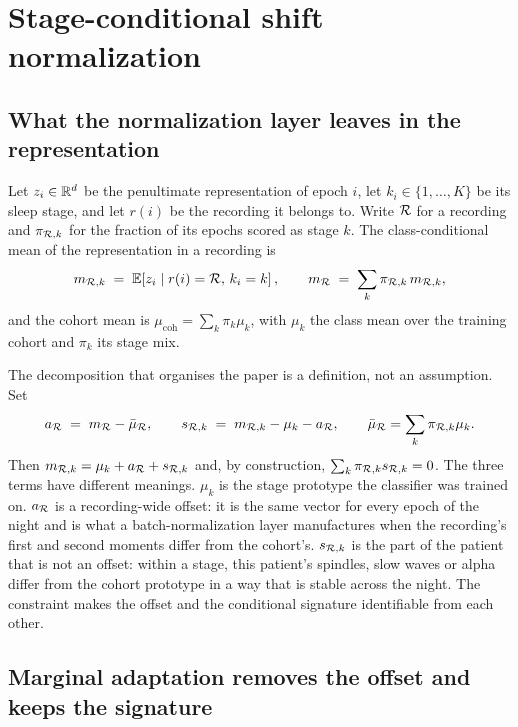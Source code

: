 \section{Stage-conditional shift normalization}
\label{sec:method}

\subsection{What the normalization layer leaves in the representation}

Let $z_i\in\mathbb{R}^d$ be the penultimate representation of epoch $i$, let
$k_i\in\{1,\dots,K\}$ be its sleep stage, and let $r(i)$ be the recording it
belongs to. Write $\mathcal{R}$ for a recording and $\pi_{\mathcal{R},k}$ for the fraction of
its epochs scored as stage $k$. The class-conditional mean of the
representation in a recording is
\begin{equation}
  m_{\mathcal{R},k} \;=\; \mathbb{E}\!\left[z_i \mid r(i)=\mathcal{R},\, k_i=k\right],
  \qquad
  m_{\mathcal{R}} \;=\; \sum_{k}\pi_{\mathcal{R},k}\,m_{\mathcal{R},k},
  \label{eq:means}
\end{equation}
and the cohort mean is $\mu_{\mathrm{coh}}=\sum_k \pi_k \mu_k$, with $\mu_k$ the
class mean over the training cohort and $\pi_k$ its stage mix.

The decomposition that organises the paper is a definition, not an
assumption. Set
\begin{equation}
  a_{\mathcal{R}} \;=\; m_{\mathcal{R}}-\bar\mu_{\mathcal{R}},
  \qquad
  s_{\mathcal{R},k} \;=\; m_{\mathcal{R},k}-\mu_k-a_{\mathcal{R}},
  \qquad
  \bar\mu_{\mathcal{R}}=\sum_k \pi_{\mathcal{R},k}\mu_k .
  \label{eq:decomp}
\end{equation}
Then $m_{\mathcal{R},k}=\mu_k+a_{\mathcal{R}}+s_{\mathcal{R},k}$ and, by construction,
$\sum_k \pi_{\mathcal{R},k}s_{\mathcal{R},k}=0$. The three terms have different meanings.
$\mu_k$ is the stage prototype the classifier was trained on. $a_{\mathcal{R}}$ is a
recording-wide offset: it is the same vector for every epoch of the night and
is what a batch-normalization layer manufactures when the recording's first
and second moments differ from the cohort's. $s_{\mathcal{R},k}$ is the part of the
patient that is not an offset: within a stage, this patient's spindles, slow
waves or alpha differ from the cohort prototype in a way that is stable across
the night. The constraint makes the offset and the conditional signature
identifiable from each other.

\subsection{Marginal adaptation removes the offset and keeps the signature}

